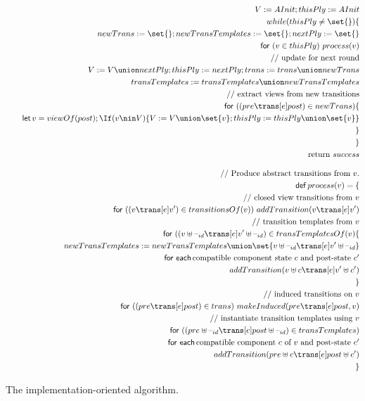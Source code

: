 \begin{figure}
\[
\begin{align}
V := AInit; thisPly := AInit \\
while(thisPly \ne \set{})\{ \\
\quad newTrans := \set{}; newTransTemplates := \set{}; nextPly := \set{} \\
\quad \For(v \in thisPly)\ process(v) \\
\quad \comment{update for next round} \\
\quad V := V \union nextPly; thisPly := nextPly; trans := trans \union newTrans \\
\quad  transTemplates := transTemplates \union newTransTemplates \\
\quad \comment{extract views from new transitions} \\
\quad \For ((pre \trans[e] post) \in newTrans)\{ \\
\qquad \Let v = viewOf(post); 
  \If(v \nin V)\{ V := V \union \set{v}; thisPly := thisPly \union \set{v} \}\\
\quad \}\\
\} \\
\mbox{return $success$}
\\[2ex]
\comment{Produce abstract transitions from $v$.} \\
\Def process(v) = \{ \\ %
\quad \comment{closed view transitions from~$v$} \\
\quad \For ((v \trans[e] v') \in transitionsOf(v)) \
   addTransition(v \trans[e] v') \\
\quad \comment{transition templates from $v$} \\
\quad \For ((v \uplus \hole{id}  \trans[e] v' \uplus \hole{id}) 
  \in transTemplatesOf(v) \{ \\
\qquad  newTransTemplates := newTransTemplates \union
   \set{v \uplus \hole{id}  \trans[e] v' \uplus \hole{id}} \\
\qquad \Foreach \mbox{compatible component state~$c$ and post-state $c'$} \\
\qquad\quad           addTransition(v \uplus c \trans[e] v' \uplus c') \\
\quad \} \\
\quad \comment{induced transitions on~$v$} \\
\quad \For ((pre \trans[e] post) \in trans)\ 
  makeInduced(pre \trans[e] post,v) \\
\quad \comment{instantiate transition templates using $v$} \\
\quad \For ((pre \uplus \hole{id} \trans[e] post \uplus \hole{id})
   \in transTemplates) \\
\qquad  \Foreach \mbox{compatible component $c$ of $v$ and post-state~$c'$} \\
\qquad\quad addTransition(pre \uplus c \trans[e] post \uplus c') \\
\} %
\end{align}
\]
\caption{The implementation-oriented algorithm.}
\label{fig:algorithm-2}
\end{figure}

